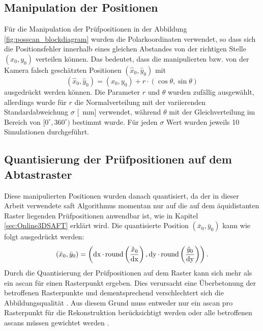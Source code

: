 \subsection{Manipulation der Positionen}
Für die Manipulation der Prüfpositionen in der Abbildung \ref{fig:posscan_blockdiagram} wurden die Polarkoordinaten verwendet, so dass sich die Positionsfehler innerhalb eines gleichen Abstandes von der richtigen Stelle $(x_{0}, y_{0})$ verteilen können. Das bedeutet, dass die manipulierten bzw. von der Kamera falsch geschätzten Positionen $(\hat{x}_0, \hat{y}_0)$ mit 
\begin{equation}
(\hat{x}_{0}, \hat{y}_{0}) = (x_{0}, y_{0}) + r \cdot (\cos \theta, \sin \theta)
\end{equation}
ausgedrückt werden können. Die Parameter $r$ und $\theta$ wurden zufällig ausgewählt, allerdings wurde für $r$ die Normalverteilung mit der variierenden Standardabweichung $\sigma$ [\SI{}{\milli\metre}] verwendet, während $\theta$ mit der Gleichverteilung im Bereich von $[0^{\circ}, 360^{\circ})$ bestimmt wurde. Für jeden $\sigma$ Wert wurden jeweils 10 Simulationen durchgeführt. \par

\subsection{Quantisierung der Prüfpositionen auf dem Abtastraster} \label{sec:quantization}
Diese manipulierten Positionen wurden danach quantisiert, da der in dieser Arbeit verwendete \acrshort{saft} Algorithmus momentan nur auf die auf dem äquidistanten Raster liegenden Prüfpositionen anwendbar ist, wie in Kapitel \ref{sec:Online3DSAFT} erklärt wird. Die quantisierte Position $(\bar{x}_0, \bar{y}_0)$ kann wie folgt ausgedrückt werden:
\begin{equation}
(\bar{x}_{0}, \bar{y}_{0}) = \left (\operatorname{dx} \cdot \operatorname{round} \left ( \frac{\hat{x}_0}{\operatorname{dx}} \right ), \operatorname{dy} \cdot \operatorname{round} \left ( \frac{\hat{y}_0}{\operatorname{dy}} \right ) \right ) .
\end{equation}
Durch die Quantisierung der Prüfpositionen auf dem Raster kann sich mehr als ein \gls{ascan} für einen Rasterpunkt ergeben. Dies verursacht eine Überbetonung der betroffenen Rasterpunkte und dementsprechend verschlechtert sich die Abbildungsqualität \cite{Krieg18SAFTwithSmartInspect}. Aus diesem Grund muss entweder nur ein \gls{ascan} pro Rasterpunkt für die Rekonstruktion berücksichtigt werden\cite{Krieg18SAFTwithSmartInspect} oder alle betroffenen \glspl{ascan} müssen gewichtet werden \cite{Mayer16SAFTwithSmallData}. \par

